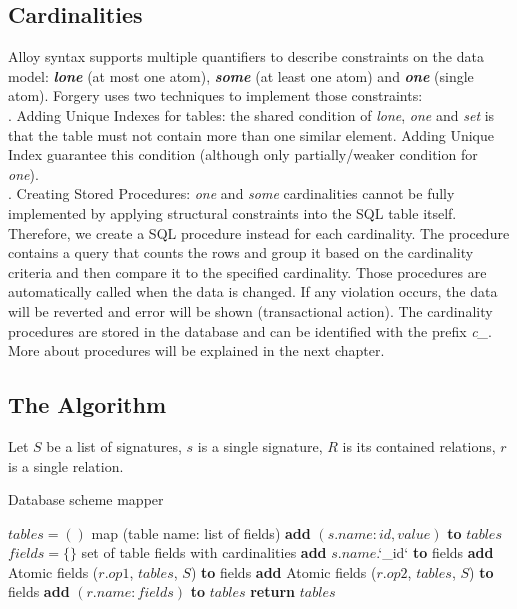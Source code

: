 \documentclass[oneside]{book}
\begin{document}
\newpage
\subsection{Cardinalities}
\noindent Alloy syntax supports multiple quantifiers to describe constraints on the data model: \textbf{\textit{lone}} (at most one atom), \textbf{\textit{some}} (at least one atom) and \textbf{\textit{one}} (single atom). Forgery uses two techniques to implement those constraints: \\

. Adding Unique Indexes for tables: the shared condition of \textit{lone}, \textit{one} and \textit{set} is that the table must not contain more than one similar element. Adding Unique Index guarantee this condition (although only partially/weaker condition for \textit{one}). \\

. Creating Stored Procedures: \textit{one} and \textit{some} cardinalities cannot be fully implemented by applying structural constraints into the SQL table itself. Therefore, we create a SQL procedure instead for each cardinality. The procedure contains a query that counts the rows and group it based on the cardinality criteria and then compare it to the specified cardinality. Those procedures are automatically called when the data is changed. If any violation occurs, the data will be reverted and error will be shown (transactional action). The cardinality procedures are stored in the database and can be identified with the prefix \textit{c\_}. More about procedures will be explained in the next chapter.
\newpage

\subsection{The Algorithm}
Let $S$ be a list of signatures, $s$ is a single signature, $R$ is its contained relations, $r$ is a single relation.\\

\begin{algorithm}
\caption{Database scheme mapper}
\label{array-sum0}
\begin{algorithmic}[1]
	\State $tables = ()$ \Comment map (table name: list of fields)
		\State \textbf{add} $(s.name: {id, value})$ \textbf{to} $tables$
			\State $fields = \{\}$ \Comment set of table fields with cardinalities
			\State \textbf{add} $s.name$.`\_id` \textbf{to} fields
			\State \textbf{add} Atomic fields ($r.op1$, $tables$, $S$) \textbf{to} fields
				\State \textbf{add} Atomic fields ($r.op2$, $tables$, $S$) \textbf{to} fields
			\EndIf
			\State \textbf{add} $(r.name: fields)$ \textbf{to} $tables$
		\EndFor
	\EndFor
	\State \textbf{return} $tables$
\EndFunction
\end{algorithmic}
\end{algorithm}\newpage
\end{document}
